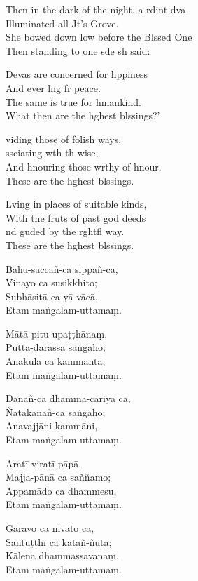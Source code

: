 Then in the dark of the night, a rdint dva\\
Illuminated all Jt's Grove.\\
She bowed down low before the Blssed One\\
Then standing to one sde sh said:

Devas are concerned for hppiness\\
And ever lng fr peace.\\
The same is true for hmankind.\\
What then are the hghest blssings?'

viding those of folish ways,\\
ssciating wth th wise,\\
And hnouring those wrthy of hnour.\\
These are the hghest blssings.

Lving in places of suitable kinds,\\
With the fruts of past god deeds\\
nd guded by the rghtfl way.\\
These are the hghest blssings.

\clearpage

Bāhu-saccañ-ca sippañ-ca,\\%
Vinayo ca susikkhito;\\
Subhāsitā ca yā vācā,\\
Etam maṅgalam-uttamaṃ.

Mātā-pitu-upaṭṭhānaṃ,\\
Putta-dārassa saṅgaho;\\
Anākulā ca kammantā,\\
Etam maṅgalam-uttamaṃ.

Dānañ-ca dhamma-cariyā ca,\\
Ñātakānañ-ca saṅgaho;\\
Anavajjāni kammāni,\\
Etam maṅgalam-uttamaṃ.

Āratī viratī pāpā,\\
Majja-pānā ca saññamo;\\
Appamādo ca dhammesu,\\
Etam maṅgalam-uttamaṃ.

Gāravo ca nivāto ca,\\
Santuṭṭhī ca katañ-ñutā;\\
Kālena dhammassavanaṃ,\\
Etam maṅgalam-uttamaṃ.

